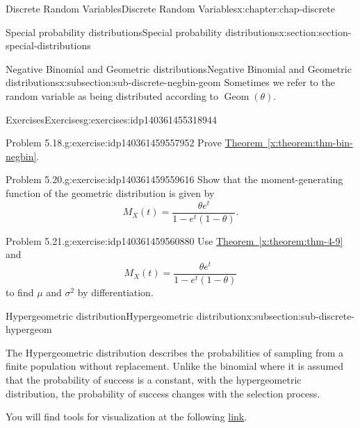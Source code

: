 \documentclass[oneside,10pt,]{book}
\newcommand{\xreffont}{\relax}
\numberwithin{equation}{section}
\begin{document}
\begin{chapterptx}{Discrete Random Variables}{}{Discrete Random Variables}{}{}{x:chapter:chap-discrete}
\begin{sectionptx}{Special probability distributions}{}{Special probability distributions}{}{}{x:section:section-special-distributions}
\begin{subsectionptx}{Negative Binomial and Geometric distributions}{}{Negative Binomial and Geometric distributions}{}{}{x:subsection:sub-discrete-negbin-geom}
Sometimes we refer to the random variable as being distributed according to \(\operatorname{Geom}(\theta)\).%
\end{subsectionptx}
%
%
\typeout{************************************************}
\typeout{************************************************}
%
\begin{exercises-subsection}{Exercises}{}{Exercises}{}{}{g:exercises:idp140361455318944}
\begin{divisionexercise}{1}{Problem 5.18.}{}{g:exercise:idp140361459557952}%
Prove \hyperref[x:theorem:thm-bin-negbin]{Theorem~{\xreffont\ref{x:theorem:thm-bin-negbin}}}.%
\end{divisionexercise}%
\begin{divisionexercise}{2}{Problem 5.20.}{}{g:exercise:idp140361459559616}%
Show that the moment-generating function of the geometric distribution is given by%
\begin{equation*}
M_X(t) = \dfrac{\theta
e^t}{1-e^t(1-\theta)}\text{.}
\end{equation*}
%
\end{divisionexercise}%
\begin{divisionexercise}{3}{Problem 5.21.}{}{g:exercise:idp140361459560880}%
Use \hyperref[x:theorem:thm-4-9]{Theorem~{\xreffont\ref{x:theorem:thm-4-9}}} and%
\begin{equation*}
M_X(t) = \dfrac{\theta
e^t}{1-e^t(1-\theta)}
\end{equation*}
to find \(\mu\) and \(\sigma^2\) by differentiation.%
\end{divisionexercise}%
\end{exercises-subsection}
%
%
\typeout{************************************************}
\typeout{************************************************}
%
\begin{subsectionptx}{Hypergeometric distribution}{}{Hypergeometric distribution}{}{}{x:subsection:sub-discrete-hypergeom}
\begin{introduction}{}%
The Hypergeometric distribution describes the probabilities of sampling from a finite population without replacement.  Unlike the binomial where it is assumed that the probability of success is a constant, with the hypergeometric distribution, the probability of success changes with the selection process.%
\par
You will find tools for visualization at the following \href{https://buddy.uco.edu/shiny/slaverty/mathstat/Hyper/}{link}.%
\end{introduction}%

\end{subsectionptx}
\end{sectionptx}
\end{chapterptx}
\end{document}
